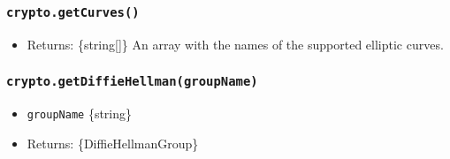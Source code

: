 \subsubsection{\texorpdfstring{\texttt{crypto.getCurves()}}{crypto.getCurves()}}\label{crypto.getcurves}

\begin{itemize}
\tightlist
\item
  Returns: \{string{[}{]}\} An array with the names of the supported
  elliptic curves.
\end{itemize}

\begin{Shaded}
\begin{Highlighting}[]
\NormalTok{ \{}
\OperatorTok{,}
\NormalTok{\} }\OperatorTok{=}  \NormalTok{(}\NormalTok{)}\OperatorTok{;}

\NormalTok{(}\NormalTok{())}\OperatorTok{;} 
\end{Highlighting}
\end{Shaded}

\begin{Shaded}
\begin{Highlighting}[]
\NormalTok{ \{}
\OperatorTok{,}
\NormalTok{\} }\OperatorTok{=} \NormalTok{(}\NormalTok{)}\OperatorTok{;}

\NormalTok{(}\NormalTok{())}\OperatorTok{;} 
\end{Highlighting}
\end{Shaded}

\subsubsection{\texorpdfstring{\texttt{crypto.getDiffieHellman(groupName)}}{crypto.getDiffieHellman(groupName)}}\label{crypto.getdiffiehellmangroupname}

\begin{itemize}
\tightlist
\item
  \texttt{groupName} \{string\}
\item
  Returns: \{DiffieHellmanGroup\}
\end{itemize}

